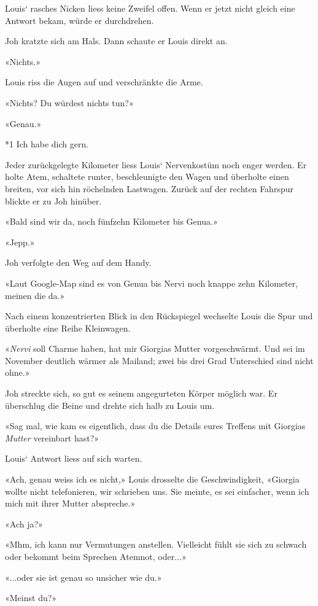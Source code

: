 Louis` rasches Nicken liess keine Zweifel offen. Wenn er jetzt nicht
gleich eine Antwort bekam, würde er durchdrehen.

Joh kratzte sich am Hals. Dann schaute er Louis direkt an.

«Nichts.»

Louis riss die Augen auf und verschränkte die Arme.

«Nichts? Du würdest nichts tun?»

«Genau.»

*1 Ich habe dich gern.

Jeder zurückgelegte Kilometer liess Louis` Nervenkostüm noch enger
werden. Er holte Atem, schaltete runter, beschleunigte den Wagen und
überholte einen breiten, vor sich hin röchelnden Lastwagen. Zurück auf
der rechten Fahrspur blickte er zu Joh hinüber.

«Bald sind wir da, noch fünfzehn Kilometer bis Genua.»

«Jepp.»

Joh verfolgte den Weg auf dem Handy.

«Laut Google-Map sind es von Genua bis Nervi noch knappe zehn Kilometer,
meinen die da.»

Nach einem konzentrierten Blick in den Rückspiegel wechselte Louis die
Spur und überholte eine Reihe Kleinwagen.

«\emph{Nervi} soll Charme haben, hat mir Giorgias Mutter vorgeschwärmt.
Und sei im November deutlich wärmer als Mailand; zwei bis drei Grad
Unterschied sind nicht ohne.»

Joh streckte sich, so gut es seinem angegurteten Körper möglich war. Er
überschlug die Beine und drehte sich halb zu Louis um.

«Sag mal, wie kam es eigentlich, dass du die Details eures Treffens mit
Giorgias \emph{Mutter} vereinbart hast?»

Louis` Antwort liess auf sich warten.

«Ach, genau weiss ich es nicht,» Louis drosselte die Geschwindigkeit,
«Giorgia wollte nicht telefonieren, wir schrieben uns. Sie meinte, es
sei einfacher, wenn ich mich mit ihrer Mutter abspreche.»

«Ach ja?»

«Mhm, ich kann nur Vermutungen anstellen. Vielleicht fühlt sie sich zu
schwach oder bekommt beim Sprechen Atemnot, oder...»

«...oder sie ist genau so unsicher wie du.»

«Meinst du?»

